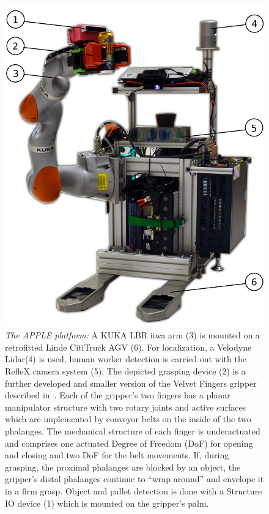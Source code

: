 \begin{figure}[t!]
\begin{center}
\includegraphics[width =0.85\linewidth]{figs/apple_demonstrator}
\caption{\textit{The APPLE platform:} A KUKA LBR iiwa arm (3) is mounted on a retrofitted Linde
  CitiTruck AGV (6). For localization, a Velodyne Lidar\protect\footnotemark (4) is used, human
  worker detection is carried out with the RefleX camera system (5). The depicted grasping device
  (2) is a further developed and smaller version of the Velvet Fingers gripper described
  in~\cite{Tinc12}. Each of the gripper’s two fingers has a planar manipulator structure with two
  rotary joints and active surfaces which are implemented by conveyor belts on the inside of the two
  phalanges. The mechanical structure of each finger is underactuated and comprises one actuated
  Degree of Freedom (DoF) for opening and closing and two DoF for the belt movements. If, during
  grasping, the proximal phalanges are blocked by an object, the gripper’s distal phalanges continue
  to ``wrap around'' and envelope it in a firm grasp. Object and pallet detection is done with a
  Structure IO device (1) which is mounted on the gripper's palm.}
\label{fig:robot}
\vspace{-0.65cm}
\end{center}
\end{figure}

